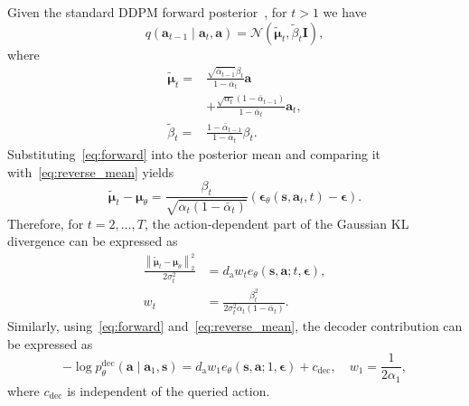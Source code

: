 \documentclass[9pt,journal]{IEEEtran}
\newcommand{\va}{\bm{a}}
\newcommand{\vs}{\bm{s}}
\newcommand{\veps}{\bm{\epsilon}}
\begin{document}
Given the standard DDPM forward posterior~\cite{ho2020ddpm}, for $t>1$ we have
\begin{equation}
    q\!\left(\va_{t-1}\mid\va_t,\va\right)
    =
    \mathcal N\!\left(
    \tilde{\bm\mu}_t,
    \tilde\beta_t\bm I
    \right),
    \label{eq:forward_posterior}
\end{equation}
where
\begin{equation}
    \begin{aligned}
        \tilde{\bm\mu}_t
        ={}&
        \frac{\sqrt{\bar\alpha_{t-1}}\beta_t}
        {1-\bar\alpha_t}\va
        \\
        &+
        \frac{\sqrt{\alpha_t}(1-\bar\alpha_{t-1})}
        {1-\bar\alpha_t}\va_t,
        \\
        \tilde\beta_t
        ={}&
        \frac{1-\bar\alpha_{t-1}}
        {1-\bar\alpha_t}\beta_t .
    \end{aligned}
    \label{eq:posterior_params}
\end{equation}
Substituting~\eqref{eq:forward} into the posterior mean and comparing it with~\eqref{eq:reverse_mean} yields
\begin{equation}
    \tilde{\bm\mu}_t-\bm\mu_\theta
    =
    \frac{\beta_t}
    {\sqrt{\alpha_t(1-\bar\alpha_t)}}
    \left(
    \veps_\theta\!\left(\vs,\va_t,t\right)-\veps
    \right).
    \label{eq:posterior_mean_gap}
\end{equation}
Therefore, for $t=2,\ldots,T$, the action-dependent part of the Gaussian KL divergence can be expressed as
\begin{equation}
    \begin{aligned}
        \frac{
        \left\|
        \tilde{\bm\mu}_t-\bm\mu_\theta
        \right\|_2^2
        }{2\sigma_t^2}
        &=
        d_{\mathrm a}w_t
        e_\theta(\vs,\va;t,\veps),
        \\
        w_t
        &=
        \frac{\beta_t^2}
        {2\sigma_t^2\alpha_t(1-\bar\alpha_t)}.
    \end{aligned}
    \label{eq:kl_residual}
\end{equation}
Similarly, using~\eqref{eq:forward} and~\eqref{eq:reverse_mean}, the decoder contribution can be expressed as
\begin{equation}
    -\log
    p_\theta^{\mathrm{dec}}
    \!\left(\va\mid\va_1,\vs\right)
    =
    d_{\mathrm a}w_1
    e_\theta(\vs,\va;1,\veps)
    +c_{\mathrm{dec}},
    \quad
    w_1=\frac{1}{2\alpha_1},
    \label{eq:decoder_energy}
\end{equation}
where $c_{\mathrm{dec}}$ is independent of the queried action.
\end{document}
